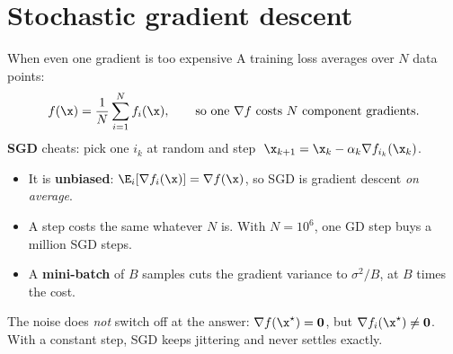 \section{Stochastic gradient descent}

\begin{frame}{When even one gradient is too expensive}
  A training loss averages over $N$ data points:
  \[
    f(\x) = \frac1N\sum_{i=1}^N f_i(\x), \qquad \text{so one } \nabla f \text{ costs } N \text{ component gradients.}
  \]
  \textbf{SGD} cheats: pick one $i_k$ at random and step $\;\x_{k+1} = \x_k-\alpha_k\nabla f_{i_k}(\x_k)$.
  \begin{itemize}\small
    \item It is \textbf{unbiased}: $\E_{i}[\nabla f_i(\x)] = \nabla f(\x)$, so SGD is gradient descent \emph{on average}.
    \item A step costs the same whatever $N$ is. With $N = 10^6$, one GD step buys a million SGD steps.
    \item A \textbf{mini-batch} of $B$ samples cuts the gradient variance to $\sigma^2/B$, at $B$ times the cost.
  \end{itemize}
  \begin{keybox}
    \small The noise does \emph{not} switch off at the answer: $\nabla f(\x^\star) = \mathbf 0$, but $\nabla f_i(\x^\star)\ne\mathbf 0$.
    With a constant step, SGD keeps jittering and never settles exactly.
  \end{keybox}
\end{frame}


